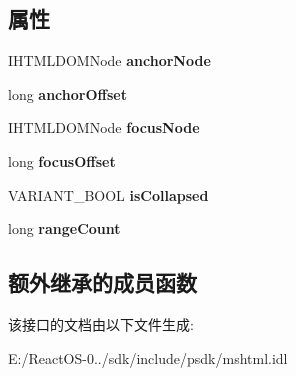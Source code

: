 \subsection*{属性}
\begin{DoxyCompactItemize}
\item 
\mbox{\label{interface_m_s_h_t_m_l_1_1_i_h_t_m_l_selection_a407a8fb9b8d366ef96fbaa2eeeaffb4a}} 
I\+H\+T\+M\+L\+D\+O\+M\+Node {\bfseries anchor\+Node}
\item 
\mbox{\label{interface_m_s_h_t_m_l_1_1_i_h_t_m_l_selection_ac47b8f58af37fa317e3d0b032f42a16a}} 
long {\bfseries anchor\+Offset}
\item 
\mbox{\label{interface_m_s_h_t_m_l_1_1_i_h_t_m_l_selection_a02f42377321718c5ddbdf5c5f465a694}} 
I\+H\+T\+M\+L\+D\+O\+M\+Node {\bfseries focus\+Node}
\item 
\mbox{\label{interface_m_s_h_t_m_l_1_1_i_h_t_m_l_selection_ae4d015af1e555689275429f0c9817d72}} 
long {\bfseries focus\+Offset}
\item 
\mbox{\label{interface_m_s_h_t_m_l_1_1_i_h_t_m_l_selection_a0e37d223fc0ef7af91ea069ba40c73a3}} 
V\+A\+R\+I\+A\+N\+T\+\_\+\+B\+O\+OL {\bfseries is\+Collapsed}
\item 
\mbox{\label{interface_m_s_h_t_m_l_1_1_i_h_t_m_l_selection_ac8e7ede2db5541fd8b6080d20304c09b}} 
long {\bfseries range\+Count}
\end{DoxyCompactItemize}
\subsection*{额外继承的成员函数}


该接口的文档由以下文件生成\+:\begin{DoxyCompactItemize}
\item 
E\+:/\+React\+O\+S-\/0../sdk/include/psdk/mshtml.\+idl\end{DoxyCompactItemize}
